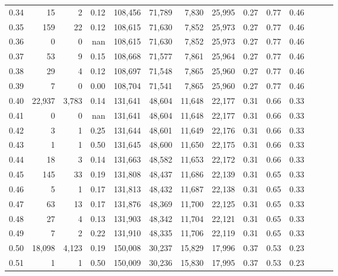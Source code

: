 \begin{tabular}{rrrrrrrrrrrrrr}
0.34 &      15 &      2 &  0.12 &  108,456 &   71,789 &   7,830 &  25,995 &  0.27 &  0.77 &      0.46 \\
0.35 &     159 &     22 &  0.12 &  108,615 &   71,630 &   7,852 &  25,973 &  0.27 &  0.77 &      0.46 \\
0.36 &       0 &      0 &   nan &  108,615 &   71,630 &   7,852 &  25,973 &  0.27 &  0.77 &      0.46 \\
0.37 &      53 &      9 &  0.15 &  108,668 &   71,577 &   7,861 &  25,964 &  0.27 &  0.77 &      0.46 \\
0.38 &      29 &      4 &  0.12 &  108,697 &   71,548 &   7,865 &  25,960 &  0.27 &  0.77 &      0.46 \\
0.39 &       7 &      0 &  0.00 &  108,704 &   71,541 &   7,865 &  25,960 &  0.27 &  0.77 &      0.46 \\
0.40 &  22,937 &  3,783 &  0.14 &  131,641 &   48,604 &  11,648 &  22,177 &  0.31 &  0.66 &      0.33 \\
0.41 &       0 &      0 &   nan &  131,641 &   48,604 &  11,648 &  22,177 &  0.31 &  0.66 &      0.33 \\
0.42 &       3 &      1 &  0.25 &  131,644 &   48,601 &  11,649 &  22,176 &  0.31 &  0.66 &      0.33 \\
0.43 &       1 &      1 &  0.50 &  131,645 &   48,600 &  11,650 &  22,175 &  0.31 &  0.66 &      0.33 \\
0.44 &      18 &      3 &  0.14 &  131,663 &   48,582 &  11,653 &  22,172 &  0.31 &  0.66 &      0.33 \\
0.45 &     145 &     33 &  0.19 &  131,808 &   48,437 &  11,686 &  22,139 &  0.31 &  0.65 &      0.33 \\
0.46 &       5 &      1 &  0.17 &  131,813 &   48,432 &  11,687 &  22,138 &  0.31 &  0.65 &      0.33 \\
0.47 &      63 &     13 &  0.17 &  131,876 &   48,369 &  11,700 &  22,125 &  0.31 &  0.65 &      0.33 \\
0.48 &      27 &      4 &  0.13 &  131,903 &   48,342 &  11,704 &  22,121 &  0.31 &  0.65 &      0.33 \\
0.49 &       7 &      2 &  0.22 &  131,910 &   48,335 &  11,706 &  22,119 &  0.31 &  0.65 &      0.33 \\
0.50 &  18,098 &  4,123 &  0.19 &  150,008 &   30,237 &  15,829 &  17,996 &  0.37 &  0.53 &      0.23 \\
0.51 &       1 &      1 &  0.50 &  150,009 &   30,236 &  15,830 &  17,995 &  0.37 &  0.53 &      0.23 \\

\end{tabular}
